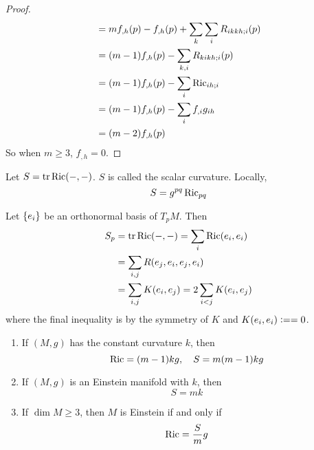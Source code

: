 \begin{enumerate}[label=\arabic{*}.]
\begin{proof}
\begin{equation*}
\begin{aligned}
				&= mf_{,h}(p)-f_{,h}(p) +  \sum_k \sum_iR_{ikkh;i}(p) \\
				&= (m-1)f_{,h}(p)-\sum_{k,i}R_{kikh;i}(p)\\
				&= (m-1)f_{,h}(p)- \sum_i\operatorname{Ric}_{ih;i} \\
				&= (m-1)f_{,h}(p)- \sum_if_{,i}g_{ih}\\
				&= (m-2)f_{,h}(p)
			\end{aligned}
		\end{equation*}
		So when $m \geq 3$, $f_{,h} = 0$.
	\end{proof}
	\begin{defn}
		Let $S = \operatorname{tr}\operatorname{Ric}(-,-)$. $S$ is called the scalar curvature. Locally,
		\begin{equation*}
			S = g^{pq}\operatorname{Ric}_{pq}
		\end{equation*}
	\end{defn}
	\begin{rmk}
		Let $\left\{e_i\right\}$ be an orthonormal basis of $T_pM$. Then
		\begin{equation*}
			\begin{aligned}
				S_p &= \operatorname{tr}\operatorname{Ric}(-,-) = \sum_i \operatorname{Ric}(e_i,e_i)\\
				&= \sum_{i,j}R(e_j,e_i,e_j,e_i) \\
				&= \sum_{i,j}K(e_i,e_j) = 2\sum_{i < j} K(e_i,e_j)
			\end{aligned}
		\end{equation*}
		where the final inequality is by the symmetry of $K$ and $K(e_i,e_i) \vcentcolon= = 0$.
	\end{rmk}
	\begin{cor}
		\begin{enumerate}[label=(\arabic{*})]
			\item If $(M,g)$ has the constant curvature $k$, then
			\begin{equation*}
				\operatorname{Ric} = (m-1)kg,\quad S = m(m-1)kg
			\end{equation*}
			\item If $(M,g)$ is an Einstein manifold with $k$, then
			\begin{equation*}
				S = mk
			\end{equation*}
			\item If $\dim M \geq 3$, then $M$ is Einstein if and only if
			\begin{equation*}
				\operatorname{Ric} = \frac{S}{m}g
			\end{equation*}
		\end{enumerate}
	\end{cor}

\end{enumerate}
